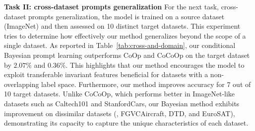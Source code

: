 \documentclass[10pt,twocolumn,letterpaper]{article}
\newcommand{\coop}{CoOp } \newcommand{\coopvpt}{CoOp+VPT } \newcommand{\cocoop}{CoCoOp } \newcommand{\cocoopvpt}{CoCoOp+VPT }
\begin{document}
\textbf{Task II: cross-dataset prompts generalization}
For the next task, cross-dataset prompts generalization, the model is trained on a source dataset (ImageNet) and then assessed on 10 distinct target datasets. This experiment tries to determine how effectively our method generalizes beyond the scope of a single dataset. 
As reported in Table~\ref{tab:cross-and-domain}, our conditional Bayesian prompt learning outperforms \coop and \cocoop on the target dataset  by $2.07\%$ and $0.36\%$. This highlights that our method encourages the model to exploit transferable invariant features beneficial for datasets with a non-overlapping label space. Furthermore, our method improves accuracy for 7 out of 10 target datasets. Unlike CoCoOp, which performs better in ImageNet-like datasets such as Caltech101 and StanfordCars, our Bayesian method exhibits improvement on dissimilar datasets (\eg, FGVCAircraft, DTD, and EuroSAT), demonstrating its capacity to capture the unique characteristics of each dataset.
\end{document}
